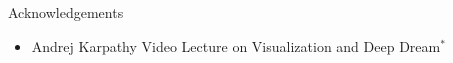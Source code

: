 \begin{frame}
	\begin{block}{Acknowledgements}
		\begin{itemize}\justifying
			\item Andrej Karpathy Video Lecture on  Visualization and Deep Dream$^*$
		\end{itemize}
	\end{block}
\end{frame}
